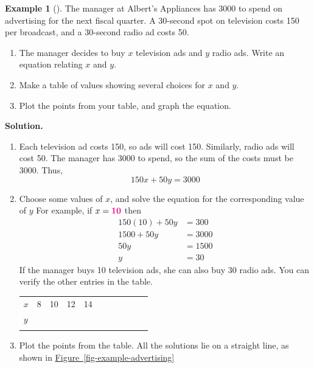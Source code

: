 \documentclass[10pt,]{book}
\theoremstyle{plain}
\theoremstyle{definition}
\theoremstyle{definition}
\newtheorem{example}[theorem]{Example}
\theoremstyle{definition}
\theoremstyle{definition}
\numberwithin{equation}{section}
\newcommand{\hrulethin}  {\noalign{\hrule height 0.04em}}
\newcommand{\hrulethick} {\noalign{\hrule height 0.11em}}
\newcommand{\alert}[1]{\mathbf{\color{magenta}{#1}}}
\newcommand{\amp}{ & }
\begin{document}
\begin{example}[]\label{example-advertising}
The manager at Albert's Appliances has \textdollar{}3000 to spend on advertising for the next fiscal quarter.  A 30-second spot on television costs \textdollar{}150 per broadcast, and a 30-second radio ad costs \textdollar{}50.%
\leavevmode%
\begin{enumerate}[label=*\alph**]
\item\hypertarget{li-44}{}The manager decides to buy \(x\) television ads and \(y\) radio ads.  Write an equation relating \(x\) and \(y\).%
\item\hypertarget{li-45}{}Make a table of values showing several choices for \(x\) and \(y\).%
\item\hypertarget{li-46}{}Plot the points from your table, and graph the equation.%
\end{enumerate}
\par\medskip\noindent%
\textbf{Solution.}\quad \leavevmode%
\begin{enumerate}[label=*\alph**]
\item\hypertarget{li-47}{}Each television ad costs \textdollar{}150, so ads will cost \textdollar{}150.  Similarly, radio ads will cost \textdollar{}50.  The manager has \textdollar{}3000 to spend, so the sum of the costs must be \textdollar{}3000.  Thus, \begin{equation*}150x+50y=3000\end{equation*}%
\item\hypertarget{li-48}{}Choose some values of \(x\), and solve the equation for the corresponding value of \(y\)  For example, if \(x=\alert{10}\) then
               \begin{align*}
150(10)+50y\amp=300\\
1500+50y\amp=3000\\
50y\amp=1500\\
y\amp=30
\end{align*}
                If the manager buys 10 television ads, she can also buy 30 radio ads.  You can verify the other entries in the table.%
\leavevmode%
\begin{table}
\centering
\begin{tabular}{AcAcAcAcAcA}\hrulethick
\(x\)&8&10&12&14\tabularnewline\hrulethin
\(y\)&&&&\tabularnewline\hrulethin
\end{tabular}
\end{table}
\item\hypertarget{li-49}{}Plot the points from the table.  All the solutions lie on a straight line, as shown in \hyperref[fig-example-advertising]{Figure~\ref{fig-example-advertising}}

\end{enumerate}
\end{example}
\end{document}
